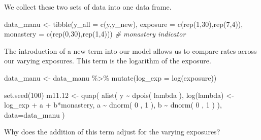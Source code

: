 \documentclass[
]{book}
\newenvironment{Shaded}{\begin{snugshade}}{\end{snugshade}}
\newcommand{\AttributeTok}[1]{\textcolor[rgb]{0.77,0.63,0.00}{#1}}
\newcommand{\CommentTok}[1]{\textcolor[rgb]{0.56,0.35,0.01}{\textit{#1}}}
\newcommand{\DecValTok}[1]{\textcolor[rgb]{0.00,0.00,0.81}{#1}}
\newcommand{\FloatTok}[1]{\textcolor[rgb]{0.00,0.00,0.81}{#1}}
\newcommand{\FunctionTok}[1]{\textcolor[rgb]{0.00,0.00,0.00}{#1}}
\newcommand{\NormalTok}[1]{#1}
\newcommand{\OtherTok}[1]{\textcolor[rgb]{0.56,0.35,0.01}{#1}}
\newcommand{\SpecialCharTok}[1]{\textcolor[rgb]{0.00,0.00,0.00}{#1}}
\begin{document}
We collect these two sets of data into one data frame.

\begin{Shaded}
\begin{Highlighting}[]
\NormalTok{data\_manu }\OtherTok{\textless{}{-}} \FunctionTok{tibble}\NormalTok{(}\AttributeTok{y\_all =} \FunctionTok{c}\NormalTok{(y,y\_new),}
                    \AttributeTok{exposure =} \FunctionTok{c}\NormalTok{(}\FunctionTok{rep}\NormalTok{(}\DecValTok{1}\NormalTok{,}\DecValTok{30}\NormalTok{),}\FunctionTok{rep}\NormalTok{(}\DecValTok{7}\NormalTok{,}\DecValTok{4}\NormalTok{)),}
                    \AttributeTok{monastery =} \FunctionTok{c}\NormalTok{(}\FunctionTok{rep}\NormalTok{(}\DecValTok{0}\NormalTok{,}\DecValTok{30}\NormalTok{),}\FunctionTok{rep}\NormalTok{(}\DecValTok{1}\NormalTok{,}\DecValTok{4}\NormalTok{))) }\CommentTok{\# monastery indicator}
\end{Highlighting}
\end{Shaded}

The introduction of a new term into our model allows us to compare rates across our varying exposures. This term is the logarithm of the exposure.

\begin{Shaded}
\begin{Highlighting}[]
\NormalTok{data\_manu }\OtherTok{\textless{}{-}}\NormalTok{ data\_manu }\SpecialCharTok{\%\textgreater{}\%} \FunctionTok{mutate}\NormalTok{(}\AttributeTok{log\_exp =} \FunctionTok{log}\NormalTok{(exposure))}

\FunctionTok{set.seed}\NormalTok{(}\DecValTok{100}\NormalTok{)}
\NormalTok{m11}\FloatTok{.12} \OtherTok{\textless{}{-}} \FunctionTok{quap}\NormalTok{( }\FunctionTok{alist}\NormalTok{( }
\NormalTok{  y }\SpecialCharTok{\textasciitilde{}} \FunctionTok{dpois}\NormalTok{( lambda ), }
  \FunctionTok{log}\NormalTok{(lambda) }\OtherTok{\textless{}{-}}\NormalTok{ log\_exp }\SpecialCharTok{+}\NormalTok{ a }\SpecialCharTok{+}\NormalTok{ b}\SpecialCharTok{*}\NormalTok{monastery, }
\NormalTok{  a }\SpecialCharTok{\textasciitilde{}} \FunctionTok{dnorm}\NormalTok{( }\DecValTok{0}\NormalTok{ , }\DecValTok{1}\NormalTok{ ), }
\NormalTok{  b }\SpecialCharTok{\textasciitilde{}} \FunctionTok{dnorm}\NormalTok{( }\DecValTok{0}\NormalTok{ , }\DecValTok{1}\NormalTok{ )}
\NormalTok{), }\AttributeTok{data=}\NormalTok{data\_manu )}
\end{Highlighting}
\end{Shaded}

Why does the addition of this term adjust for the varying exposures?
\end{document}

